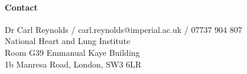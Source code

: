 \documentclass[a4paper,10pt]{article}
\begin{document}
\vspace{1cm}

\paragraph{Contact} 
\begin{flushleft}
Dr Carl Reynolds / carl.reynolds@imperial.ac.uk / 07737 904 807 \\ 
National Heart and Lung Institute\\
Room G39 Emmanual Kaye Building\\
1b Manresa Road, London, SW3 6LR
\end{flushleft}


 
\end{document}
